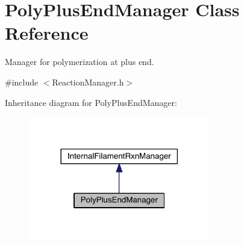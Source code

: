 \hypertarget{classPolyPlusEndManager}{\section{Poly\+Plus\+End\+Manager Class Reference}
\label{classPolyPlusEndManager}
}


Manager for polymerization at plus end.  




{\ttfamily \#include $<$Reaction\+Manager.\+h$>$}



Inheritance diagram for Poly\+Plus\+End\+Manager\+:\nopagebreak
\begin{figure}[H]
\begin{center}
\leavevmode
\includegraphics[width=225pt]{classPolyPlusEndManager__inherit__graph}
\end{center}
\end{figure}


